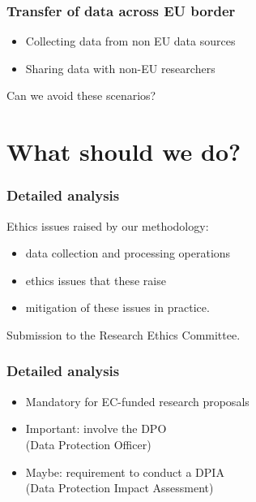 \documentclass[17pt,aspectratio=169,hyperref={pdfusetitle,colorlinks,allcolors=olive}]{beamer}
\begin{document}
\begin{frame}[fragile]
  \frametitle{Transfer of data across EU border}

  \begin{itemize}
  \item Collecting data from non EU data sources
  \item Sharing data with non-EU researchers
  \end{itemize}

  \begin{flushright}
    Can we avoid these scenarios?
  \end{flushright}
\end{frame}

\section{What should we do?}

\begin{frame}[fragile]
  \frametitle{Detailed analysis}

  Ethics issues raised by our methodology:

  \begin{itemize}
  \item data collection and processing operations
  \item ethics issues that these raise
  \item mitigation of these issues in practice.
  \end{itemize}

  Submission to the Research Ethics Committee.
\end{frame}

\begin{frame}[fragile]
  \frametitle{Detailed analysis}

  \begin{itemize}
  \item Mandatory for EC-funded research proposals

  \item Important: involve the DPO \\
  (Data Protection Officer)

  \item Maybe: requirement to conduct a DPIA \\
    (Data Protection Impact Assessment)
  \end{itemize}
\end{frame}
\end{document}
